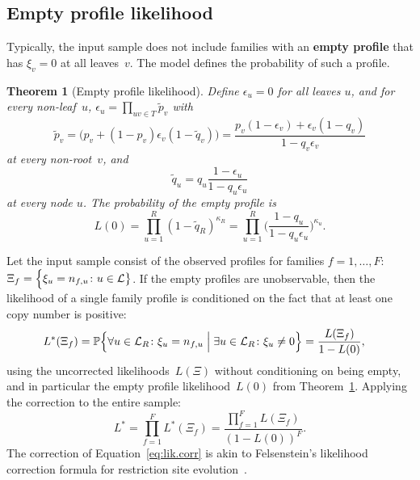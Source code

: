 \documentclass{elsarticle}
\newcommand{\condgen}[6]{{#1}#2 #5 #3 #6 #4}
\newcommand{\PROB}{\mathbb{P}}
\newcommand{\Probcmd}[2]{\condgen{\PROB}{\Bigl\{}{\Bigm|}{\Bigr\}}{#1}{#2}}
\newcommand{\definehere}[1]{\textcolor{webbrown}{\bf #1}}
\newtheorem{theorem}{Theorem}
\newcommand{\nx}{u}
\newcommand{\ny}{v}
\newcommand{\troot}{R}
\begin{document}
\subsection{Empty profile likelihood}
Typically, the input sample does not include families with an
\definehere{empty profile} that has $\xi_{\ny}=0$ at all leaves~$\ny$.
The model defines the probability of such a profile. 

\begin{theorem}[Empty profile likelihood]\label{tm:empty}
Define  $\epsilon_{\nx}=0$ for all leaves $\nx$, and 
for every non-leaf~$\nx$, 
$\epsilon_{\nx}= \prod_{\nx\ny\in T}\tilde{p}_{\ny}$ 
with \[
\tilde{p}_{\ny}=\bigl(p_{\ny}+(1-p_{\ny})\epsilon_{\ny}(1-\tilde{q}_{\ny})\bigr)
=\frac{p_{\ny}(1-\epsilon_{\ny})+\epsilon_{\ny}(1-q_{\ny})}{1-q_{\ny}\epsilon_{\ny}}
\]
at every non-root~$\ny$, and 
\[
\tilde{q}_{\nx} = q_{\nx}\frac{1-\epsilon_{\nx}}{1-q_{\nx}\epsilon_{\nx}}
\]
at every node $\nx$.
The 
probability of the empty profile is 
\[
L(0) = \prod_{\nx=1}^R(1-\tilde{q}_{\troot})^{\kappa_{\troot}}
	= \prod_{\nx=1}^R \biggl(\frac{1-q_{\nx}}{1-q_{\nx}\epsilon_{\nx}}\biggr)^{\kappa_{\nx}}.
\]
\end{theorem}

Let the input sample consist of the observed profiles 
for families $f=1,\dotsc,F$: 
$\Xi_f=\Bigl\{\xi_{\nx}=n_{f,{\nx}}\colon \nx\in \mathcal{L}\bigr\}$. 
If the empty profiles are unobservable, then the likelihood of a single family profile is 
conditioned on the fact that at least one copy number is positive:
\begin{align*}
L^*(\Xi_f) & 
	= \Probcmd{\forall \nx\in \mathcal{L}_{\troot}\colon \xi_{\nx}=n_{f,\nx}}{\exists \nx\in \mathcal{L}_{\troot}\colon \xi_{\nx}\ne 0}
	= \frac{L(\Xi_f)}{1-L(0)},
\end{align*}
using the uncorrected likelihoods~$L(\Xi)$
without conditioning on being empty, and in particular 
the empty profile likelihood~$L(0)$ from Theorem~\ref{tm:empty}.
Applying the correction to the entire sample: 
\begin{equation}\label{eq:lik.corr}
L^* = \prod_{f=1}^F L^*(\Xi_f) = \frac{\prod_{f=1}^F L(\Xi_f)}{(1-L(0))^{F}}.
\end{equation}
The correction of Equation~\eqref{eq:lik.corr} 
is akin to Felsenstein's 
likelihood correction formula for restriction site evolution~\cite{Felsenstein.restml}.
\end{document}
